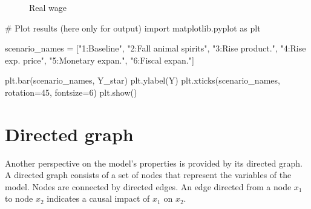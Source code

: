 \documentclass[
  letterpaper,
  DIV=11,
  numbers=noendperiod]{scrreprt}
\newenvironment{Shaded}{\begin{snugshade}}{\end{snugshade}}
\newcommand{\CommentTok}[1]{\textcolor[rgb]{0.37,0.37,0.37}{#1}}
\newcommand{\DecValTok}[1]{\textcolor[rgb]{0.68,0.00,0.00}{#1}}
\newcommand{\ImportTok}[1]{\textcolor[rgb]{0.00,0.46,0.62}{#1}}
\newcommand{\NormalTok}[1]{\textcolor[rgb]{0.00,0.23,0.31}{#1}}
\newcommand{\OperatorTok}[1]{\textcolor[rgb]{0.37,0.37,0.37}{#1}}
\newcommand{\StringTok}[1]{\textcolor[rgb]{0.13,0.47,0.30}{#1}}
\begin{document}
\begin{figure}[H]


\caption{\label{fig-real-wage-neocl-macro}Real wage}

\end{figure}%

\begin{tcolorbox}[enhanced jigsaw, titlerule=0mm, breakable, bottomrule=.15mm, toprule=.15mm, colbacktitle=quarto-callout-note-color!10!white, rightrule=.15mm, toptitle=1mm, opacityback=0, left=2mm, coltitle=black, title=\textcolor{quarto-callout-note-color}{\faInfo}\hspace{0.5em}{Python code}, colframe=quarto-callout-note-color-frame, opacitybacktitle=0.6, leftrule=.75mm, bottomtitle=1mm, arc=.35mm, colback=white]

\begin{Shaded}
\begin{Highlighting}[]
\CommentTok{\# Plot results (here only for output) }
\ImportTok{import}\NormalTok{ matplotlib.pyplot }\ImportTok{as}\NormalTok{ plt}
   
\NormalTok{scenario\_names }\OperatorTok{=}\NormalTok{ [}\StringTok{"1:Baseline"}\NormalTok{, }\StringTok{"2:Fall animal spirits"}\NormalTok{, }\StringTok{"3:Rise product."}\NormalTok{,}
                  \StringTok{"4:Rise exp. price"}\NormalTok{, }\StringTok{"5:Monetary expan."}\NormalTok{, }\StringTok{"6:Fiscal expan."}\NormalTok{]}

\NormalTok{plt.bar(scenario\_names, Y\_star)}
\NormalTok{plt.ylabel(}\StringTok{\textquotesingle{}Y\textquotesingle{}}\NormalTok{)}
\NormalTok{plt.xticks(scenario\_names, rotation}\OperatorTok{=}\DecValTok{45}\NormalTok{, fontsize}\OperatorTok{=}\DecValTok{6}\NormalTok{)}
\NormalTok{plt.show()}
\end{Highlighting}
\end{Shaded}

\end{tcolorbox}

\section{Directed graph}\label{directed-graph-2}

Another perspective on the model's properties is provided by its
directed graph. A directed graph consists of a set of nodes that
represent the variables of the model. Nodes are connected by directed
edges. An edge directed from a node \(x_1\) to node \(x_2\) indicates a
causal impact of \(x_1\) on \(x_2\).
\end{document}
